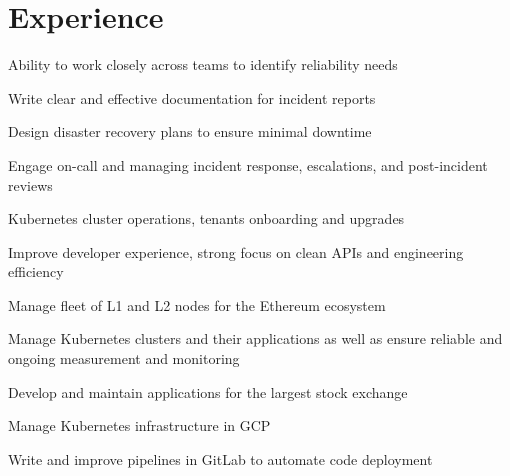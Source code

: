 \documentclass[]{willianpaixao-resume}
\begin{document}
\begin{minipage}[t]{0.64\textwidth}

\section{Experience}
\sectionsep
\begin{tightemize}
\item Ability to work closely across teams to identify reliability needs
\item Write clear and effective documentation for incident reports
\item Design disaster recovery plans to ensure minimal downtime
\end{tightemize}
\sectionsep

\sectionsep
\begin{tightemize}
\item Engage on-call and managing incident response, escalations, and post-incident reviews
\item Kubernetes cluster operations, tenants onboarding and  upgrades
\item Improve developer experience, strong focus on clean APIs and engineering efficiency
\end{tightemize}
\sectionsep

\sectionsep
\begin{tightemize}
\item Manage fleet of L1 and L2 nodes for the Ethereum ecosystem
\item Manage Kubernetes clusters and their applications as well as ensure reliable and ongoing measurement and monitoring
\end{tightemize}
\sectionsep

\sectionsep
\begin{tightemize}
\item Develop and maintain applications for the largest stock exchange
\item Manage Kubernetes infrastructure in GCP
\item Write and improve pipelines in GitLab to automate code deployment
\end{tightemize}
\sectionsep


\end{minipage}
\end{document}
